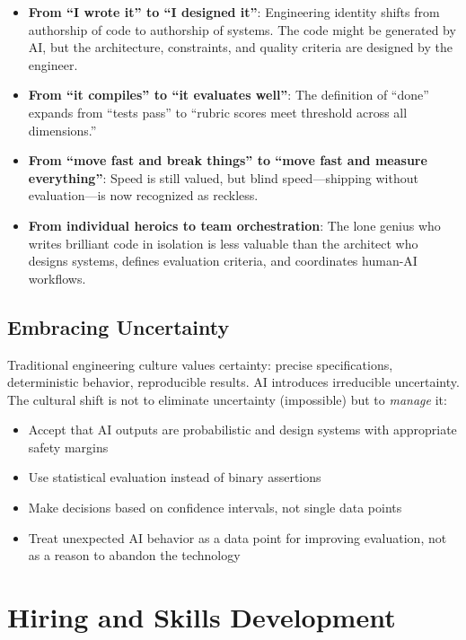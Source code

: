 \begin{itemize}[leftmargin=*]
    \item \textbf{From ``I wrote it'' to ``I designed it''}: Engineering identity shifts from authorship of code to authorship of systems. The code might be generated by AI, but the architecture, constraints, and quality criteria are designed by the engineer.
    \item \textbf{From ``it compiles'' to ``it evaluates well''}: The definition of ``done'' expands from ``tests pass'' to ``rubric scores meet threshold across all dimensions.''
    \item \textbf{From ``move fast and break things'' to ``move fast and measure everything''}: Speed is still valued, but blind speed---shipping without evaluation---is now recognized as reckless.
    \item \textbf{From individual heroics to team orchestration}: The lone genius who writes brilliant code in isolation is less valuable than the architect who designs systems, defines evaluation criteria, and coordinates human-AI workflows.
\end{itemize}

\subsection{Embracing Uncertainty}

Traditional engineering culture values certainty: precise specifications, deterministic behavior, reproducible results. AI introduces irreducible uncertainty. The cultural shift is not to eliminate uncertainty (impossible) but to \emph{manage} it:

\begin{itemize}[leftmargin=*]
    \item Accept that AI outputs are probabilistic and design systems with appropriate safety margins
    \item Use statistical evaluation instead of binary assertions
    \item Make decisions based on confidence intervals, not single data points
    \item Treat unexpected AI behavior as a data point for improving evaluation, not as a reason to abandon the technology
\end{itemize}


\section{Hiring and Skills Development}

